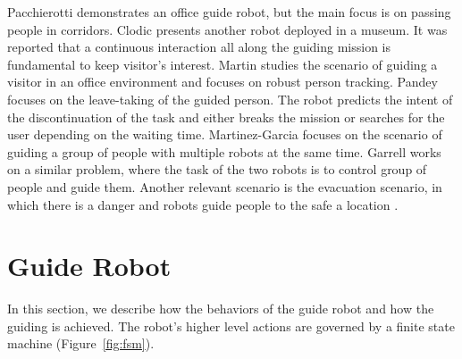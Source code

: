Pacchierotti \cite{pacchierotti2006design} demonstrates an office guide robot, but the main focus is on passing people in corridors. Clodic \cite{clodic2006rackham} presents another robot deployed in a museum. It was reported that a continuous interaction all along the guiding mission is fundamental to keep visitor's interest. Martin \cite{martin2004conception} studies the scenario of guiding a visitor in an office environment and focuses on robust person tracking. Pandey \cite{pandey2009step} focuses on the leave-taking of the guided person. The robot predicts the intent of the discontinuation of the task and either breaks the mission or searches for the user depending on the waiting time. Martinez-Garcia \cite{martinez2005crowding} focuses on the scenario of guiding a group of people with multiple robots at the same time. Garrell \cite{garrell2010local} works on a similar problem, where the task of the two robots is to control group of people and guide them. Another relevant scenario is the evacuation scenario, in which there is a danger and robots guide people to the safe a location \cite{kim2009portable,robinette2011incorporating}.

\section{Guide Robot}
\label{sec:guidance_guide_robot}

In this section, we describe how the behaviors of the guide robot and how the guiding is achieved. The robot's higher level actions are governed by a finite state machine (Figure~\ref{fig:fsm}). 

